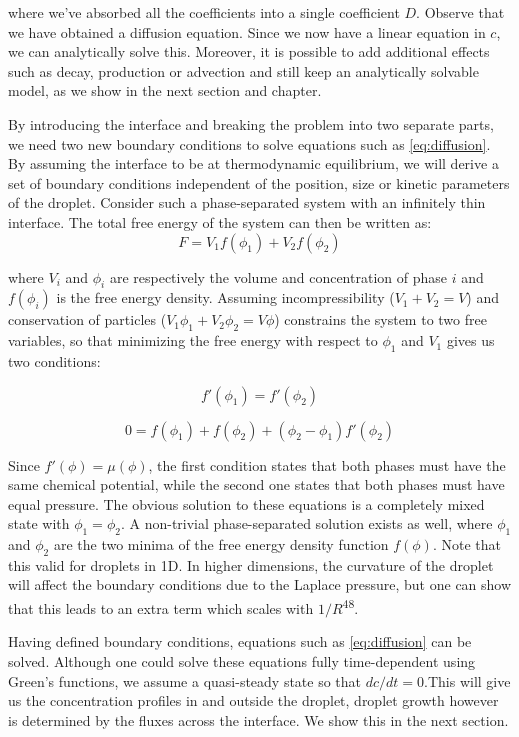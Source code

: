 \documentclass{Dissertate}
\begin{document}
where we've absorbed all the coefficients into a single coefficient
\(D\). Observe that we have obtained a diffusion equation. Since we now
have a linear equation in \(c\), we can analytically solve this.
Moreover, it is possible to add additional effects such as decay,
production or advection and still keep an analytically solvable model,
as we show in the next section and chapter.

By introducing the interface and breaking the problem into two separate
parts, we need two new boundary conditions to solve equations such as
\ref{eq:diffusion}. By assuming the interface to be at thermodynamic
equilibrium, we will derive a set of boundary conditions independent of
the position, size or kinetic parameters of the droplet. Consider such a
phase-separated system with an infinitely thin interface. The total free
energy of the system can then be written as: \[
F = V_1 f(\phi_1) + V_2 f(\phi_2)
\]

where \(V_i\) and \(\phi_i\) are respectively the volume and
concentration of phase \(i\) and \(f(\phi_i)\) is the free energy
density. Assuming incompressibility (\(V_1+V_2=V\)) and conservation of
particles (\(V_1\phi_1+V_2\phi_2=V\phi\)) constrains the system to two
free variables, so that minimizing the free energy with respect to
\(\phi_1\) and \(V_1\) gives us two conditions:

\[
f'(\phi_1) = f'(\phi_2)
\]

\[
0 = f(\phi_1) + f(\phi_2) + (\phi_2-\phi_1)f'(\phi_2)
\]

Since \(f'(\phi) = \mu(\phi)\), the first condition states that both
phases must have the same chemical potential, while the second one
states that both phases must have equal pressure. The obvious solution
to these equations is a completely mixed state with \(\phi_1=\phi_2\). A
non-trivial phase-separated solution exists as well, where \(\phi_1\)
and \(\phi_2\) are the two minima of the free energy density function
\(f(\phi)\). Note that this valid for droplets in 1D. In higher
dimensions, the curvature of the droplet will affect the boundary
conditions due to the Laplace pressure, but one can show that this leads
to an extra term which scales with \(1/R\)\textsuperscript{48}.

Having defined boundary conditions, equations such as
\ref{eq:diffusion} can be solved. Although one could solve these
equations fully time-dependent using Green's functions, we assume a
quasi-steady state so that \(dc/dt=0\).This will give us the
concentration profiles in and outside the droplet, droplet growth
however is determined by the fluxes across the interface. We show this
in the next section.
\end{document}
